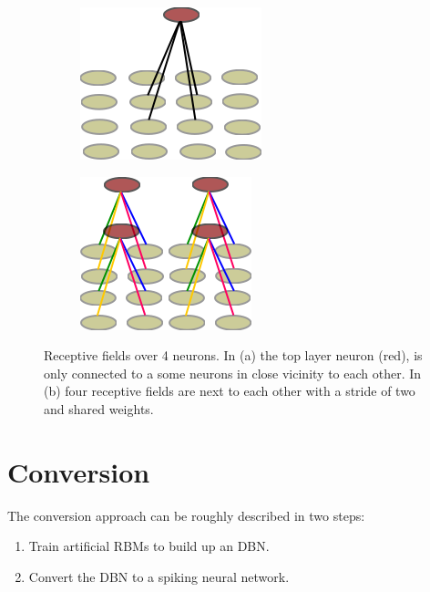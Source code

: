 \begin{figure}[h!]
	\centering
	\begin{subfigure}[t]{.4\textwidth}
  		\centering
  		\includegraphics[width=.5\linewidth]{imgs/recpt_field1.png}
  		\caption{}
  		\label{fig:receptfields1}
	\end{subfigure}%
	\begin{subfigure}[t]{.4\textwidth}
  		\centering
  		\includegraphics[width=.5\linewidth]{imgs/recpt_field2.png}
  		\caption{}
  		\label{fig:receptfields2}
	\end{subfigure}
	\caption[Receptive fields over 4 neurons.]{Receptive fields over 4 neurons. In (a) the top layer neuron (red), is only connected to a some neurons in close vicinity to each other. In (b) four receptive fields are next to each other with a stride of two and shared weights. }
	\label{fig:receptfields}
\end{figure}




\section{Conversion} \label{c:convappro}

The conversion approach can be roughly described in two steps:
\begin{enumerate}
\item Train artificial RBMs to build up an DBN.
\item Convert the DBN to a spiking neural network.
\end{enumerate}


